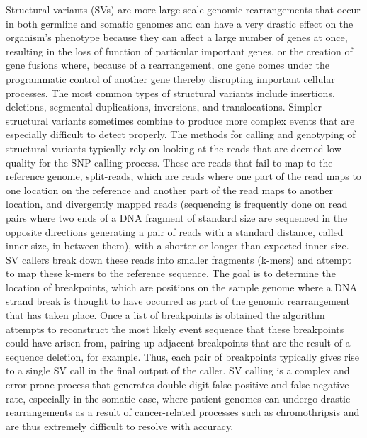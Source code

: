 Structural variants (SVs) are more large scale genomic rearrangements that occur in both germline and somatic genomes and can have a very drastic effect on the organism's phenotype because they can affect a large number of genes at once, resulting in the loss of function of particular important genes, or the creation of gene fusions where, because of a rearrangement, one gene comes under the programmatic control of another gene thereby disrupting important cellular processes. The most common types of structural variants include insertions, deletions, segmental duplications, inversions, and translocations. Simpler structural variants sometimes combine to produce more complex events that are especially difficult to detect properly. The methods for calling and genotyping of structural variants typically rely on looking at the reads that are deemed low quality for the SNP calling process\autocite{guan2016structural}. These are reads that fail to map to the reference genome, split-reads, which are reads where one part of the read maps to one location on the reference and another part of the read maps to another location, and divergently mapped reads (sequencing is frequently done on read pairs where two ends of a DNA fragment of standard size are sequenced in the opposite directions generating a pair of reads with a standard distance, called inner size, in-between them), with a shorter or longer than expected inner size. SV callers break down these reads into smaller fragments (k-mers) and attempt to map these k-mers to the reference sequence. The goal is to determine the location of breakpoints, which are positions on the sample genome where a DNA strand break is thought to have occurred as part of the genomic rearrangement that has taken place. Once a list of breakpoints is obtained the algorithm attempts to reconstruct the most likely event sequence that these breakpoints could have arisen from, pairing up adjacent breakpoints that are the result of a sequence deletion, for example. Thus, each pair of breakpoints typically gives rise to a single SV call in the final output of the caller. SV calling is a complex and error-prone process that generates double-digit false-positive and false-negative rate, especially in the somatic case, where patient genomes can undergo drastic rearrangements as a result of cancer-related processes such as chromothripsis\autocite{korbel2013criteria} and are thus extremely difficult to resolve with accuracy.

